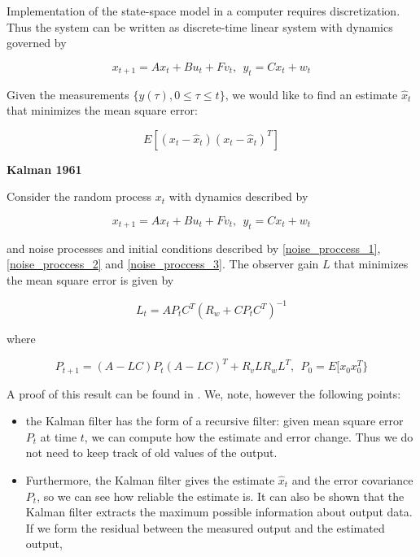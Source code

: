 Implementation of the state-space model in a computer requires discretization. Thus the system can be written as discrete-time linear system with dynamics governed by

\begin{equation}
x_{t+1} = Ax_t + Bu_t + Fv_t,  ~~ y_t = Cx_t + w_t 
\end{equation}

Given the measurements $\{y(\tau), 0 \leq \tau \leq t \}$, we would like to find an estimate $\hat{x}_t$ that minimizes the mean square error:

\begin{equation}
E[(x_t - \hat{x}_t)(x_t - \hat{x}_t)^T] 
\end{equation}

\begin{framed}
\theoremstyle{theorem}
\begin{theorem}{\textbf{Kalman 1961}}


Consider the random process $x_t$ with dynamics described by  

\begin{equation}
x_{t+1} = Ax_t + Bu_t + Fv_t,  ~~ y_t = Cx_t + w_t \nonumber
\end{equation} 

and noise processes and initial conditions described by \ref{noise_proccess_1},  \ref{noise_proccess_2} and 
\ref{noise_proccess_3}. The observer gain $L$ that minimizes the mean square error is given by  

\begin{equation}
L_t = AP_tC^T(R_w + CP_tC^T)^{-1}  \nonumber
\end{equation}

where

\begin{equation}
P_{t+1} =  (A − LC)P_t(A − LC)^T + R_v LR_w L^T, ~~ P_0 = E[x_0x^{T}_0\}
\end{equation}

\end{theorem}
\end{framed}

A proof of this result can be found in \cite{Astrom}. We, note, however the following points:

\begin{itemize}
\item the Kalman filter has the form of a recursive filter: given mean square error $P_t$ at time $t$, we can compute how the estimate and error change. Thus we do not need to keep track of old values of the output.
\item Furthermore, the Kalman filter gives the estimate $\hat{x}_t$ and the error covariance $P_t$, so we can see how reliable the estimate is. 
It can also be shown that the Kalman filter extracts the maximum possible information about output data. 
If we form the residual between the measured output and the estimated output,
\end{itemize}


